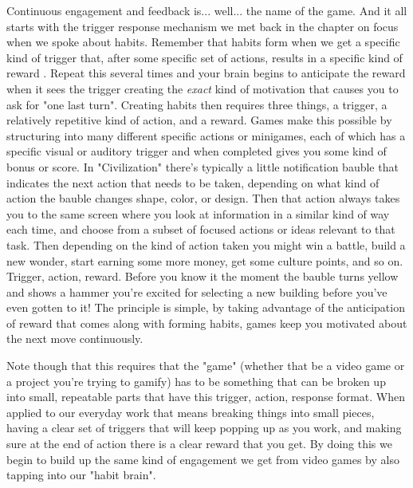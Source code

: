 \documentclass[11pt,a5paper]{book}
\begin{document}
Continuous engagement and feedback is... well... the name of the game. And it all starts with the trigger response mechanism we met back in the chapter on focus when we spoke about habits. Remember  that habits form when we get a specific kind of trigger that, after some specific set of actions, results in a specific kind of reward \cite{duhigg}. Repeat this several times and your brain begins to anticipate the reward when it sees the trigger creating the \textit{exact} kind of motivation that causes you to ask for "one last turn". Creating habits then requires three things, a trigger, a relatively repetitive kind of action, and a reward. Games make this possible by structuring into many different specific actions or minigames, each of which has a specific visual or auditory trigger and when completed gives you some kind of bonus or score. In "Civilization" there's typically a little notification bauble that indicates the next action that needs to be taken, depending on what kind of action the bauble changes shape, color, or design. Then that action always takes you to the same screen where you look at information in a similar kind of way each time, and choose from a subset of focused actions or ideas relevant to that task. Then depending on the kind of action taken you might win a battle, build a new wonder, start earning some more money, get some culture points, and so on. Trigger, action, reward. Before you know it the moment the bauble turns yellow and shows a hammer you're excited for selecting a new building before you've even gotten to it! The principle is simple, by taking advantage of the anticipation of reward that comes along with forming habits, games keep you motivated about the next move continuously.  
\newline

Note though that this requires that the "game" (whether that be a video game or a project you're trying to gamify) has to be something that can be broken up into small, repeatable parts that have this trigger, action, response format. When applied to our everyday work that means breaking things into small pieces, having a clear set of triggers that will keep popping up as you work, and making sure at the end of action there is a clear reward that you get. By doing this we begin to build up the same kind of engagement we get from video games by also tapping into our "habit brain". 
\newline
\end{document}
